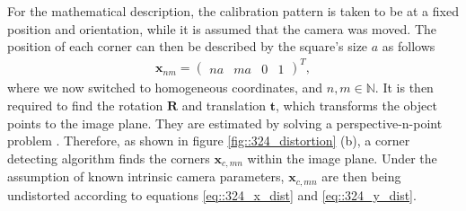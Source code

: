 For the mathematical description, the calibration pattern is taken to be at a fixed position and orientation, while it is assumed that the camera was moved. The position of each corner can then be described by the square's size $a$ as follows
\begin{align}
	\bm{x}_{nm} = \begin{pmatrix}
	na & ma & 0 & 1
	\end{pmatrix}^T,
\end{align}
where we now switched to homogeneous coordinates, and $n,m\in\mathbb{N}$. It is then required to find the rotation $\bm{R}$ and translation $\bm{t}$, which transforms the object points to the image plane. They are estimated by solving a perspective-n-point problem \cite{fischler1981random}. Therefore, as shown in figure \ref{fig::324_distortion} (b), a corner detecting algorithm finds the corners $\bm{x}_{c,mn}$ within the image plane. Under the assumption of known intrinsic camera parameters, $\bm{x}_{c,mn}$ are then being undistorted according to equations \ref{eq::324_x_dist} and \ref{eq::324_y_dist}.
